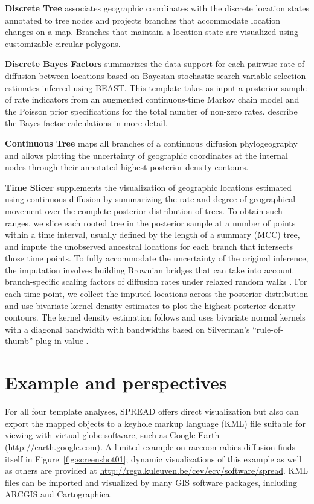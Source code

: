 \textbf{Discrete Tree} associates geographic coordinates with the discrete location states annotated to tree nodes and projects branches that accommodate location changes on a map.
Branches that maintain a location state are visualized using customizable circular polygons.

\textbf{Discrete Bayes Factors} summarizes the data support for each pairwise rate of diffusion between locations based on Bayesian stochastic search variable selection estimates inferred using BEAST.
This template takes as input a posterior sample of rate indicators from an augmented continuous-time Markov chain model and the Poisson prior specifications for the total number of non-zero rates.
\cite{Lemey2009} describe the Bayes factor calculations in more detail.

\textbf{Continuous Tree} maps all branches of a continuous diffusion phylogeography and allows plotting the uncertainty of geographic coordinates at the internal nodes through their annotated highest posterior density contours.

\textbf{Time Slicer} supplements the visualization of geographic locations estimated using continuous diffusion by summarizing the rate and degree of geographical movement over the complete posterior distribution of trees.
To obtain such ranges, we slice each rooted tree in the posterior sample at a number of points within a time interval, usually defined by the length of a summary (MCC) tree, and impute the unobserved ancestral locations for each branch that intersects those time points. To fully accommodate the uncertainty of the original inference, the imputation involves building Brownian bridges that can take into account branch-specific scaling factors of diffusion rates under relaxed random walks \citep{Lemey2010}. For each time point, we collect the imputed locations across the posterior distribution and use bivariate kernel density estimates to plot the highest posterior density contours.
The kernel density estimation follows \cite{Snyder1978} and uses bivariate normal kernels with a diagonal bandwidth with bandwidths based on Silverman's ``rule-of-thumb''  plug-in value \citep{Silverman1986}.

\section{Example and perspectives}

For all four template analyses, SPREAD offers direct visualization but also can export the mapped objects to a keyhole markup language (KML) file suitable for viewing with virtual globe software, such as Google Earth (\url{http://earth.google.com}).
A limited example on raccoon rabies diffusion \citep{Lemey2009} finds itself in Figure~\ref{fig:screenshot01};
dynamic visualizations of this example as well as others are provided at \url{http://rega.kuleuven.be/cev/ecv/software/spread}.
KML files can be imported and visualized by many GIS software packages, including ARCGIS and Cartographica.  

